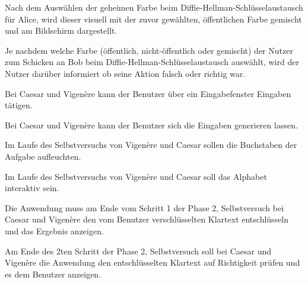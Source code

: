 \documentclass{article}
\begin{document}
\begin{T}[start = 30]
 \item Nach dem Auswählen der geheimen Farbe beim Diffie-Hellman-Schlüsselaustausch für Alice, wird dieser visuell mit der zuvor gewählten, öffentlichen Farbe gemischt und am Bildschirm dargestellt.
\end{T}

\begin{T}[start = 40]
 \item Je nachdem welche Farbe (öffentlich, nicht-öffentlich oder gemischt) der Nutzer zum Schicken an Bob beim Diffie-Hellman-Schlüsselaustausch auswählt, wird der Nutzer darüber informiert ob seine Aktion falsch oder richtig war.
\end{T}

\begin{T}[start = 50]
 \item Bei Caesar und Vigenère kann der Benutzer über ein Eingabefenster Eingaben tätigen.
\end{T}

\begin{T}[start = 60]
 \item Bei Caesar und Vigenère kann der Benutzer sich die Eingaben generieren lassen.
\end{T}

\begin{T}[start = 70]
 \item Im Laufe des Selbstversuchs von Vigenère und Caesar sollen die Buchstaben der Aufgabe aufleuchten.
\end{T}

\begin{T}[start = 80]
 \item Im Laufe des Selbstversuchs von Vigenère und Caesar soll das Alphabet interaktiv sein.
\end{T}

\begin{T}[start = 90]
 \item Die Anwendung muss am Ende vom Schritt 1 der Phase 2, Selbstversuch bei Caesar und Vigenère den vom 
       Benutzer verschlüsselten Klartext entschlüsseln und das Ergebnis anzeigen.
\end{T}

\begin{T}[start = 100]
 \item Am Ende des 2ten Schritt der Phase 2, Selbstversuch soll bei Caesar und Vigenère die Anwendung den entschlüsselten Klartext 
       auf Richtigkeit prüfen und es dem Benutzer anzeigen.
\end{T}
\end{document}
